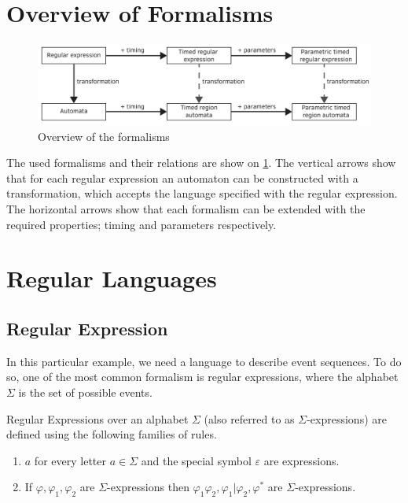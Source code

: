 \section{Overview of Formalisms}


\begin{figure}[h]
	\centering
	\includegraphics[width=0.95\linewidth]{figures/chapter_4/folyamatabra}
	\caption{Overview of the formalisms \redraw}
	\label{fig:cep:folyamatabra}
\end{figure}

The used formalisms and their relations are show on \cref{fig:cep:folyamatabra}.
The vertical arrows show that for each regular expression an automaton can be constructed with a transformation, which accepts the language specified with the regular expression.
The horizontal arrows show that each formalism can be extended with the required properties; timing and parameters respectively.
	
\section{Regular Languages}
	\subsection{Regular Expression}
	
		In this particular example, we need a language to describe event sequences. To do so, one of the most common formalism is regular expressions, where the alphabet $\Sigma$ is the set of possible events.

		
		\begin{dfn}
			\label{dfn:cep:re}
			Regular Expressions over an alphabet $\Sigma$ (also referred to as $\Sigma$-expressions)
			are defined using the following families of rules.
			\begin{enumerate}
				\item $a$ for every letter $a \in \Sigma$ and the special symbol $\varepsilon$ are expressions.
				\item If $\varphi, \varphi_1, \varphi_2$ are $\Sigma$-expressions then %
					$ %
					\varphi_1 \varphi_2,
					\varphi_1 | \varphi_2,
					\varphi^\ast
					$ are $\Sigma$-expressions\citep{tre}.
			\end{enumerate}
		\end{dfn}

